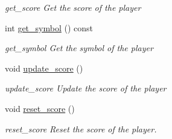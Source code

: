 \begin{DoxyCompactItemize}
\begin{DoxyCompactList}\small\item\em get\+\_\+score Get the score of the player \end{DoxyCompactList}\item 
int \hyperlink{class_tic_tac_toe_player_a5e73a7154c82e2a09f1b89e5e5d70796}{get\+\_\+symbol} () const
\begin{DoxyCompactList}\small\item\em get\+\_\+symbol Get the symbol of the player \end{DoxyCompactList}\item 
\mbox{\label{class_tic_tac_toe_player_a98589a86842d7c49b082fd3449bd3ba3}} 
void \hyperlink{class_tic_tac_toe_player_a98589a86842d7c49b082fd3449bd3ba3}{update\+\_\+score} ()
\begin{DoxyCompactList}\small\item\em update\+\_\+score Update the score of the player \end{DoxyCompactList}\item 
\mbox{\label{class_tic_tac_toe_player_a7fbb25d79fc17351288bcf0298605f3b}} 
void \hyperlink{class_tic_tac_toe_player_a7fbb25d79fc17351288bcf0298605f3b}{reset\+\_\+score} ()
\begin{DoxyCompactList}\small\item\em reset\+\_\+score Reset the score of the player. \end{DoxyCompactList}\end{DoxyCompactItemize}
